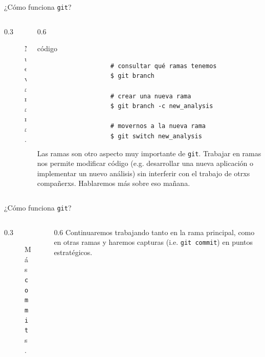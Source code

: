 \documentclass{beamer}
\begin{document}
\begin{frame}[fragile]{¿Cómo funciona \texttt{git}?}
    \begin{columns}
        \begin{column}{0.3\textwidth}
            \begin{figure}
                \centering
                
                \caption{Nueva rama.}
            \end{figure}
        \end{column}
        \begin{column}{0.6\textwidth}
            \begin{exampleblock}{código}
                \scriptsize
                \begin{verbatim}
                    # consultar qué ramas tenemos
                    $ git branch

                    # crear una nueva rama
                    $ git branch -c new_analysis

                    # movernos a la nueva rama
                    $ git switch new_analysis
                \end{verbatim}
            \end{exampleblock}
            Las ramas son otro aspecto muy importante de \texttt{git}.\newline
            Trabajar en ramas nos permite modificar código (e.g. desarrollar una
            nueva aplicación o implementar un nuevo análisis) sin interferir con el trabajo
            de otrxs compañerxs.\newline
            Hablaremos más sobre eso mañana. 
        \end{column}
    \end{columns}
\end{frame}

\begin{frame}[fragile]{¿Cómo funciona \texttt{git}?}
    \begin{columns}
        \begin{column}{0.3\textwidth}
            \begin{figure}
                \centering
                
                \caption{Más \texttt{commit}s.}
            \end{figure}
        \end{column}
        \begin{column}{0.6\textwidth}
            Continuaremos trabajando tanto en la rama principal, como en otras ramas y
            haremos capturas (i.e. \texttt{git commit}) en puntos estratégicos.
        \end{column}
    \end{columns}
\end{frame}
\end{document}
